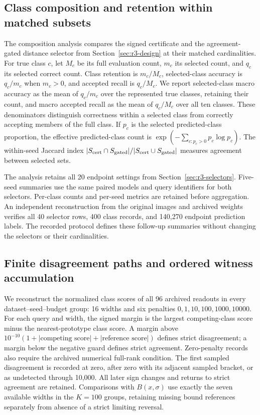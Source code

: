 \subsection{Class composition and retention within matched subsets}
\label{sec:r4-composition-design}
The composition analysis compares the signed certificate and the agreement-gated distance selector from Section~\ref{sec:r3-design} at their matched cardinalities. For true class $c$, let $M_c$ be its full evaluation count, $m_c$ its selected count, and $q_c$ its selected correct count. Class retention is $m_c/M_c$, selected-class accuracy is $q_c/m_c$ when $m_c>0$, and accepted recall is $q_c/M_c$. We report selected-class macro accuracy as the mean of $q_c/m_c$ over the represented true classes, retaining their count, and macro accepted recall as the mean of $q_c/M_c$ over all ten classes. These denominators distinguish correctness within a selected class from correctly accepting members of the full class. If $p_c$ is the selected predicted-class proportion, the effective predicted-class count is $\exp(-\sum_{c:p_c>0}p_c\log p_c)$. The within-seed Jaccard index $|S_{\rm cert}\cap S_{\rm gated}|/|S_{\rm cert}\cup S_{\rm gated}|$ measures agreement between selected sets.

The analysis retains all 20 endpoint settings from Section~\ref{sec:r3-selectors}. Five-seed summaries use the same paired models and query identifiers for both selectors. Per-class counts and per-seed metrics are retained before aggregation. An independent reconstruction from the original images and archived weights verifies all 40 selector rows, 400 class records, and 140,270 endpoint prediction labels. The recorded protocol defines these follow-up summaries without changing the selectors or their cardinalities.

\subsection{Finite disagreement paths and ordered witness accumulation}
\label{sec:r4-path-design}
We reconstruct the normalized class scores of all 96 archived readouts in every dataset--seed--budget group: 16 widths and six penalties $0,1,10,100,1000,10000$. For each query and width, the signed margin is the largest competing-class score minus the nearest-prototype class score. A margin above $10^{-10}(1+|\text{competing score}|+|\text{reference score}|)$ defines strict disagreement; a margin below the negative guard defines strict agreement. Zero-penalty records also require the archived numerical full-rank condition. The first sampled disagreement is recorded at zero, after zero with its adjacent sampled bracket, or as undetected through 10,000. All later sign changes and returns to strict agreement are retained. Comparisons with $B(x,\sigma)$ use exactly the seven available widths in the $K=100$ groups, retaining missing bound references separately from absence of a strict limiting reversal.

